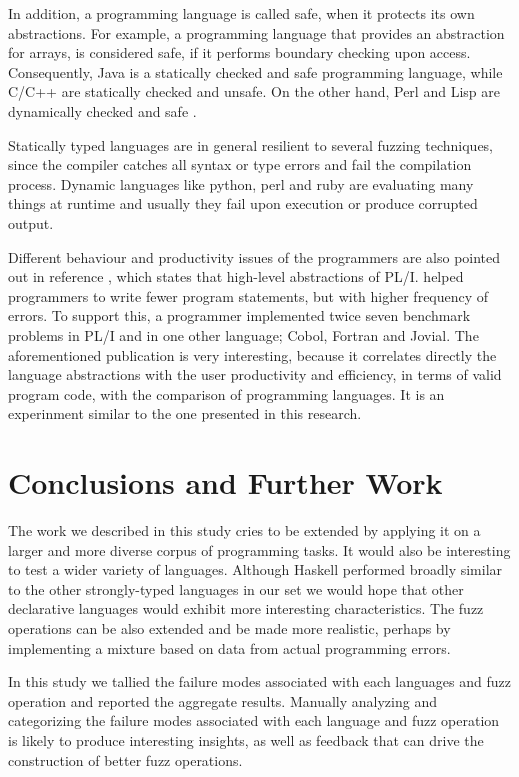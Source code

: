 \documentclass[10pt]{sigplanconf}
\begin{document}
In addition, a programming language is called safe, when it protects its own abstractions. For example, a programming language that provides an abstraction for arrays, is considered safe, if it performs boundary checking upon access. Consequently, Java is a statically checked and safe programming language, while C/C++ are statically checked and unsafe. On the other hand, Perl and Lisp are dynamically checked and safe \cite{Pie02}.

Statically typed languages are in general resilient to several fuzzing techniques, since the compiler catches all syntax or type errors and fail the compilation process. Dynamic languages like python, perl and ruby are evaluating many things at runtime and usually they fail upon execution or produce corrupted output.

Different behaviour and productivity issues of the programmers are also pointed out in reference \cite{RWSB68}, which states that high-level abstractions of PL/I. helped programmers to write fewer program statements, but with higher frequency of errors. To support this, a programmer implemented twice seven benchmark problems in PL/I and in one other language; Cobol, Fortran and Jovial. The aforementioned publication is very interesting, because it correlates directly the language abstractions with the user productivity and efficiency, in terms of valid program code, with the comparison of programming languages. It is an experinment similar to the one presented in this research.

\section{Conclusions and Further Work} %
\label{sec:conclusions}

The work we described in this study cries to be extended
by applying it on a larger and more diverse corpus of programming tasks.
It would also be interesting to test a wider variety of languages.
Although Haskell performed broadly similar to the other strongly-typed
languages in our set we would hope that other declarative languages
would exhibit more interesting characteristics.
The fuzz operations can be also extended and be made more realistic,
perhaps by implementing a mixture based on data from actual programming
errors.

In this study we tallied the failure modes associated with each
languages and fuzz operation and reported the aggregate results.
Manually analyzing and categorizing the failure modes associated
with each language and fuzz operation is likely to produce
interesting insights, as well as feedback that can drive the
construction of better fuzz operations.
\end{document}
